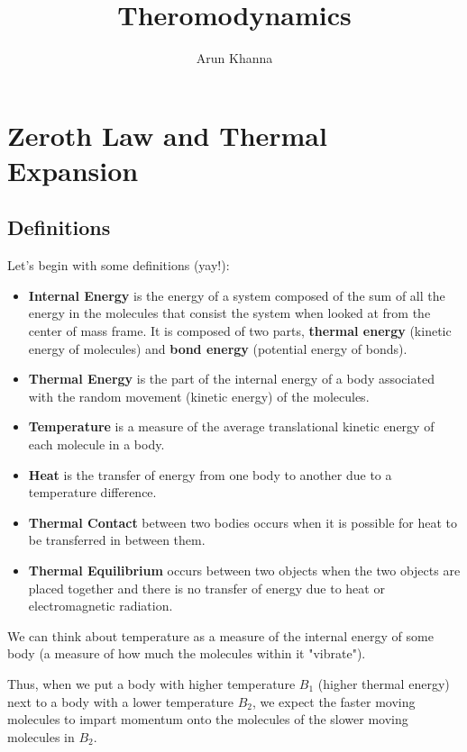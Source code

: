 \documentclass{report}
\title{Theromodynamics}
\author{Arun Khanna}
\date{}
\begin{document}
\maketitle
\tableofcontents

\newpage

\chapter{Zeroth Law and Thermal Expansion}
\section{Definitions}

Let's begin with some definitions (yay!):

\begin{itemize}
	\item \textbf{Internal Energy} is the energy of a system composed of the sum of all the energy in the molecules that consist the system when looked at from the center of mass frame. It is composed of two parts, \textbf{thermal energy} (kinetic energy of molecules) and \textbf{bond energy} (potential energy of bonds).
	\item \textbf{Thermal Energy} is the part of the internal energy of a body associated with the random movement (kinetic energy) of the molecules.
	\item \textbf{Temperature} is a measure of the average translational kinetic energy of each molecule in a body.
	\item \textbf{Heat} is the transfer of energy from one body to another due to a temperature difference.
	\item \textbf{Thermal Contact} between two bodies occurs when it is possible for heat to be transferred in between them.
	\item \textbf{Thermal Equilibrium} occurs between two objects when the two objects are placed together and there is no transfer of energy due to heat or electromagnetic radiation.
	
\end{itemize}

We can think about temperature as a measure of the internal energy of some body (a measure of how much the molecules within it "vibrate").

Thus, when we put a body with higher temperature $B_1$ (higher thermal energy) next to a body with a lower temperature $B_2$, we expect the faster moving molecules
to impart momentum onto the molecules of the slower moving molecules in $B_2$. 
\end{document}
